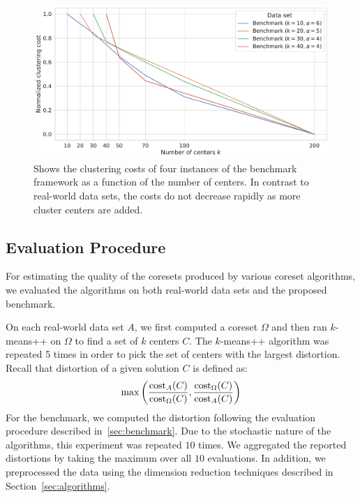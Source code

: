 \begin{figure}
  \caption{Shows the clustering costs of four instances of the benchmark framework as a function of the number of centers. In contrast to real-world data sets, the costs do not decrease rapidly as more cluster centers are added.
  }
  \label{fig:cost-curves-benchmark}
  \includegraphics[width=1\linewidth]{figures/cost-curves-benchmark.pdf}
\end{figure}



\subsection{Evaluation Procedure}
For estimating the quality of the coresets produced by various coreset algorithms, we evaluated the algorithms on both real-world data sets and the proposed benchmark. 

On each real-world data set $A$, we first computed a coreset $\Omega$ and then ran $k$-means++ on $\Omega$ to find a set of $k$ centers $C$. The $k$-means++ algorithm was repeated 5 times in order to pick the set of centers with the largest distortion. Recall that distortion of a given solution $C$ is defined as:
$$
    \max\left(
      \frac{\text{cost}_A(C)}{\text{cost}_{\Omega}(C)},
      \frac{\text{cost}_{\Omega}(C)}{\text{cost}_A(C)}
    \right)
$$
For the benchmark, we computed the distortion following the evaluation procedure described in~\cref{sec:benchmark}. Due to the stochastic nature of the algorithms, this experiment was repeated $10$ times. We aggregated the reported distortions by taking the maximum over all $10$ evaluations. In addition, we preprocessed the data using the dimension reduction techniques described in Section~\ref{sec:algorithms}.



